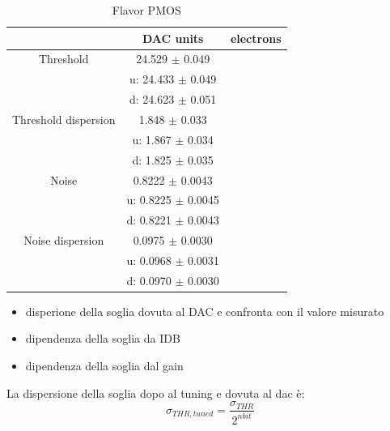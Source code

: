         \begin{table}
                \begin{center}
                \begin{tabular}{| c | c | c |}
                \hline
                 & DAC units & electrons \\
                \hline
                \hline
                Threshold        & 24.529 $\pm$ 0.049 & \\
                                 &u: 24.433 $\pm$ 0.049 & \\ 
                                 &d: 24.623 $\pm$ 0.051 &    \\      
                Threshold dispersion & 1.848 $\pm$ 0.033 &\\
                                 &u: 1.867 $\pm$ 0.034 & \\ 
                                 &d: 1.825 $\pm$ 0.035 &    \\ 
                Noise            & 0.8222 $\pm$ 0.0043 & \\
                                 &u: 0.8225 $\pm$ 0.0045 & \\ 
                                 &d: 0.8221 $\pm$ 0.0043 &    \\      
                Noise dispersion & 0.0975 $\pm$ 0.0030 &\\
                                 &u: 0.0968 $\pm$ 0.0031 & \\ 
                                 &d: 0.0970 $\pm$ 0.0030 &    \\ 
                \hline
                \end{tabular}
                \caption{Flavor PMOS}
                \label{tab:}
                \end{center}
        \end{table}        
    


    \begin{itemize}
        \item disperione della soglia dovuta al DAC e confronta con il valore misurato
        \item dipendenza della soglia da IDB
        \item dipendenza della soglia dal gain
    \end{itemize}    
    La dispersione della soglia dopo al tuning e dovuta al dac è: 
        \begin{equation}
            \sigma_{THR, tuned} = \frac{\sigma_{THR}}{2^{n bit}}
        \end{equation}
    
